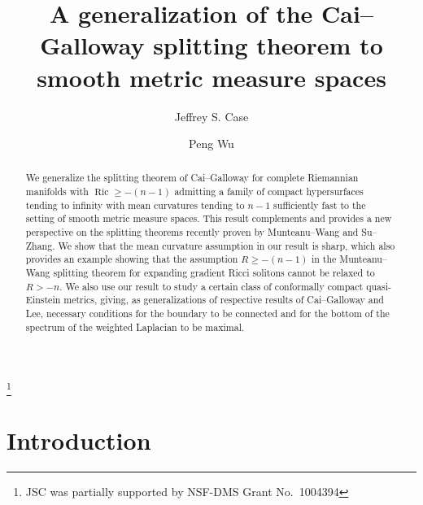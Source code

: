 \documentclass{amsart}
\theoremstyle{definition}
\theoremstyle{remark}
\numberwithin{equation}{section}
\begin{document}
\title[Cai--Galloway splitting theorem for SMMS]{A generalization of the Cai--Galloway splitting theorem to smooth metric measure spaces}
\author{Jeffrey S. Case}
\thanks{JSC was partially supported by NSF-DMS Grant No.\ 1004394}
\address{Department of Mathematics \\ 1004 Fine Hall\\ Princeton University \\ Princeton, NJ 08544}
\author{Peng Wu}
\address{Department of Mathematics \\ 583 Malott Hall \\ Cornell University \\ Ithaca, NY 14853}
\begin{abstract}
We generalize the splitting theorem of Cai--Galloway for complete Riemannian manifolds with $\operatorname{Ric}\geq-(n-1)$ admitting a family of compact hypersurfaces tending to infinity with mean curvatures tending to $n-1$ sufficiently fast to the setting of smooth metric measure spaces.  This result complements and provides a new perspective on the splitting theorems recently proven by Munteanu--Wang and Su--Zhang.  We show that the mean curvature assumption in our result is sharp, which also provides an example showing that the assumption $R\geq-(n-1)$ in the Munteanu--Wang splitting theorem for expanding gradient Ricci solitons cannot be relaxed to $R>-n$.  We also use our result to study a certain class of conformally compact quasi-Einstein metrics, giving, as generalizations of respective results of Cai--Galloway and Lee, necessary conditions for the boundary to be connected and for the bottom of the spectrum of the weighted Laplacian to be maximal.
\end{abstract}
\maketitle

\section{Introduction}
\label{sec:intro}
\end{document}
